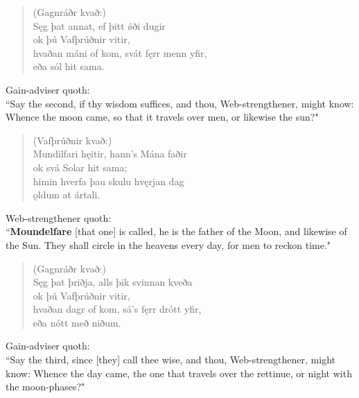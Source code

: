 \begin{verse}
(Gagnráðr kvað:) \\%
\bva Sęg þat annat, \hld ef þitt ǿði dugir \\%
\ind ok þú Vafþrúðnir vitir, \\%
hvaðan máni of kom, \hld svát fęrr menn yfir, \\%
\ind eða sól hit sama.\\%
\end{verse}

\bvb Gain-adviser quoth: \\ “Say the second, if thy wisdom suffices, and thou, Web-strengthener, might know: Whence the moon came, so that it travels over men, or likewise the sun?" \\

\begin{verse}
(Vafþrúðnir kvað:) \\%
\bva Mundilfari hęitir, \hld hann's Mána faðir \\%
\ind ok svá Solar hit sama; \\%
himin hverfa \hld þau skulu hvęrjan dag \\%
\ind ǫldum at ártali.\\%
\end{verse}

\bvb Web-strengthener quoth: \\ “\textbf{Moundelfare} [that one] is called, he is the father of the Moon, and likewise of the Sun. They shall circle in the heavens every day, for men to reckon time\footnotemark[40]." \\

\begin{verse}
(Gagnráðr kvað:) \\%
\bva Sęg þat þriðja, \hld alls þik svinnan kveða \\%
\ind ok þú Vafþrúðnir vitir, \\%
hvaðan dagr of kom, \hld sá's fęrr drótt yfir, \\%
\ind eða nótt með niðum.\\%
\end{verse}

\bvb Gain-adviser quoth: \\ “Say the third, since [they] call thee wise, and thou, Web-strengthener, might know: Whence the day came, the one that travels over the rettinue, or night with the moon-phases?" \\

